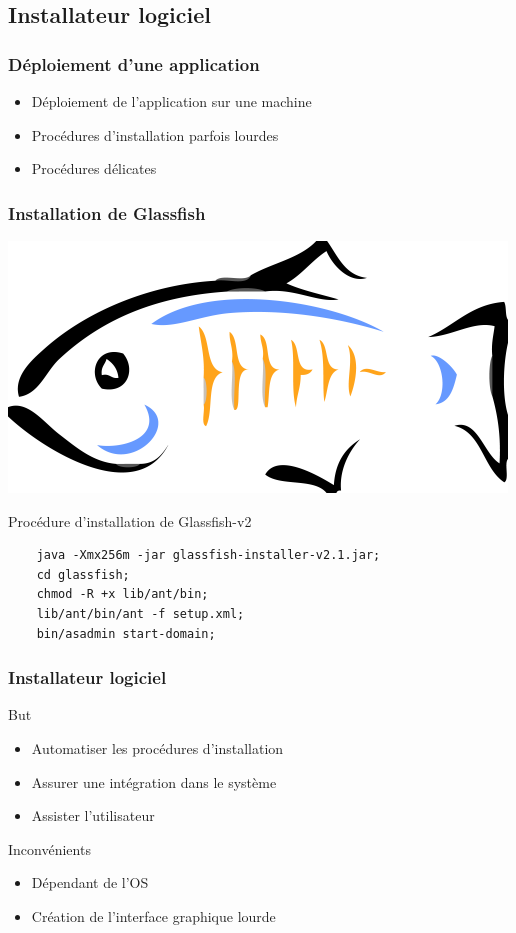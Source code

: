 \subsection{Installateur logiciel}
\begin{frame}\frametitle{Déploiement d'une application}
\begin{itemize}
 \item Déploiement de l'application sur une machine
 \item Procédures d'installation parfois lourdes
 \item Procédures délicates
\end{itemize}
\end{frame}
\begin{frame}[fragile]\frametitle{Installation de Glassfish}

\centering
\includegraphics[width=.3\linewidth]{../image/glassfishLogo.png}
\vfill
\begin{beamerboxesrounded}[shadow=true]{Proc\'edure d'installation de Glassfish-v2}
	
	\begin{verbatim}
	java -Xmx256m -jar glassfish-installer-v2.1.jar;
	cd glassfish;
	chmod -R +x lib/ant/bin;
	lib/ant/bin/ant -f setup.xml;
	bin/asadmin start-domain;
	\end{verbatim}
\end{beamerboxesrounded}
\end{frame}
\begin{frame}\frametitle{Installateur logiciel}
\begin{beamerboxesrounded}[shadow=true]{But}
 \begin{itemize}
  \item Automatiser les procédures d'installation
  \item Assurer une intégration dans le système
  \item Assister l'utilisateur
 \end{itemize}
\end{beamerboxesrounded}
\vfill
\begin{beamerboxesrounded}[shadow=true]{Inconvénients}
 \begin{itemize}
  \item Dépendant de l'OS
  \item Création de l'interface graphique lourde
 \end{itemize}
\end{beamerboxesrounded}
\end{frame}
